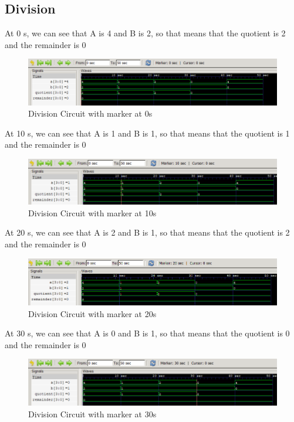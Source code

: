 \documentclass[12pt]{article}
\begin{document}
\newpage

\subsection{Division}

At 0 s, we can see that A is 4 and B is 2, so that means that the quotient is 2 and the remainder is 0
\begin{figure}[h]
    \centering
    \includegraphics[width = 1.0\textwidth]{figs/Div0.png}
    \caption{Division Circuit with marker at 0s}
    \label{fig:enter-label}
\end{figure}

At 10 s, we can see that A is 1 and B is 1, so that means that the quotient is 1 and the remainder is 0
\begin{figure}[h]
    \centering
    \includegraphics[width = 1.0\textwidth]{figs/Div10.png}
    \caption{Division Circuit with marker at 10s}
    \label{fig:enter-label}
\end{figure}

At 20 s, we can see that A is 2 and B is 1, so that means that the quotient is 2 and the remainder is 0
\begin{figure}[h]
    \centering
    \includegraphics[width = 1.0\textwidth]{figs/Div20.png}
    \caption{Division Circuit with marker at 20s}
    \label{fig:enter-label}
\end{figure}

\newpage

At 30 s, we can see that A is 0 and B is 1, so that means that the quotient is 0 and the remainder is 0
\begin{figure}[h]
    \centering
    \includegraphics[width = 1.0\textwidth]{figs/Div30.png}
    \caption{Division Circuit with marker at 30s}
    \label{fig:enter-label}
\end{figure}
\end{document}

